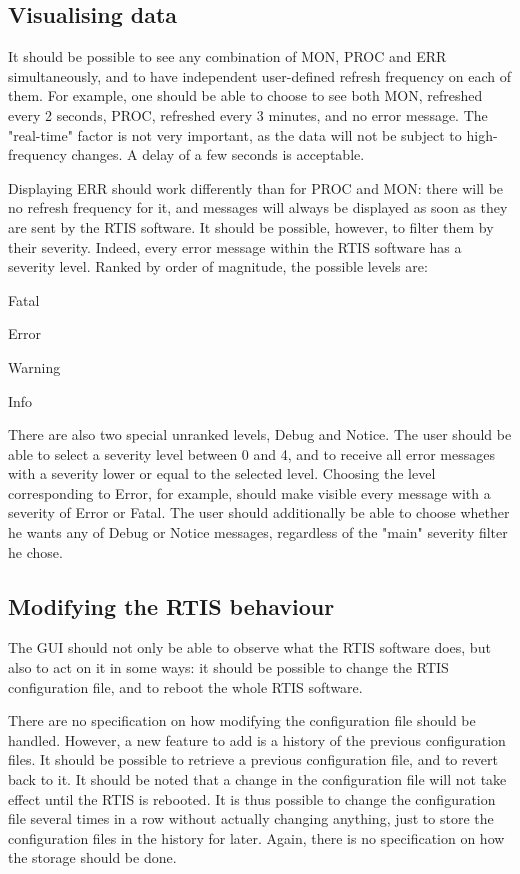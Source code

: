 \documentclass{themeensg}
\begin{document}
\subsection{Visualising data}

It should be possible to see any combination of MON, PROC and ERR simultaneously, and to have independent user-defined refresh frequency on each of them. For example, one should be able to choose to see both MON, refreshed every 2 seconds, PROC, refreshed every 3 minutes, and no error message. The "real-time" factor is not very important, as the data will not be subject to high-frequency changes. A delay of a few seconds is acceptable.

Displaying ERR should work differently than for PROC and MON: there will be no refresh frequency for it, and messages will always be displayed as soon as they are sent by the RTIS software. It should be possible, however, to filter them by their severity. Indeed, every error message within the RTIS software has a severity level. Ranked by order of magnitude, the possible levels are: \begin{enumerate*}
  \item Fatal
  \item Error
  \item Warning
  \item Info
\end{enumerate*}
There are also two special unranked levels, Debug and Notice. The user should be able to select a severity level between 0 and 4, and to receive all error messages with a severity lower or equal to the selected level. Choosing the level corresponding to Error, for example, should make visible every message with a severity of Error or Fatal. The user should additionally be able to choose whether he wants any of Debug or Notice messages, regardless of the "main" severity filter he chose.

\subsection{Modifying the RTIS behaviour}

The GUI should not only be able to observe what the RTIS software does, but also to act on it in some ways: it should be possible to change the RTIS configuration file, and to reboot the whole RTIS software.

There are no specification on how modifying the configuration file should be handled. However, a new feature to add is a history of the previous configuration files. It should be possible to retrieve a previous configuration file, and to revert back to it. It should be noted that a change in the configuration file will not take effect until the RTIS is rebooted. It is thus possible to change the configuration file several times in a row without actually changing anything, just to store the configuration files in the history for later. Again, there is no specification on how the storage should be done.
\end{document}
